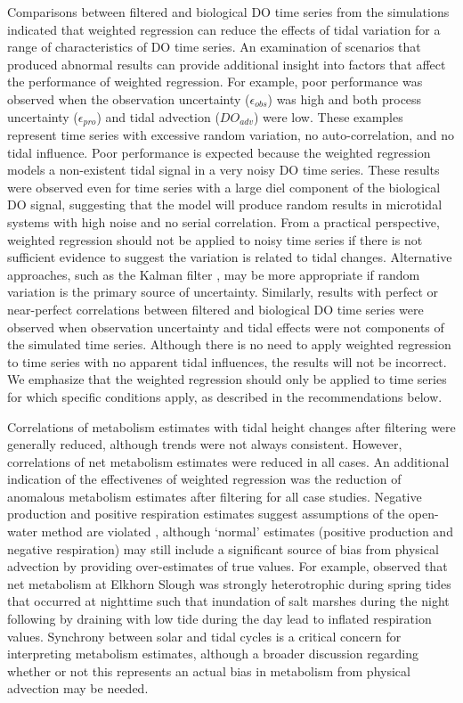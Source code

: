 \documentclass[letterpaper,12pt,oneside]{article}\usepackage[]{graphicx}\usepackage[]{color}
\begin{document}
Comparisons between filtered and biological \ac{DO} time series from the simulations indicated that weighted regression can reduce the effects of tidal variation for a range of characteristics of \ac{DO} time series.  An examination of scenarios that produced abnormal results can provide additional insight into factors that affect the performance of weighted regression.  For example, poor performance was observed when the observation uncertainty ($\epsilon_{obs}$) was high and both process uncertainty ($\epsilon_{pro}$) and tidal advection ($DO_{adv}$) were low.  These examples represent time series with excessive random variation, no auto-correlation, and no tidal influence.  Poor performance is expected because the weighted regression models a non-existent tidal signal in a very noisy \ac{DO} time series.  These results were observed even for time series with a large diel component of the biological \ac{DO} signal, suggesting that the model will produce random results in microtidal systems with high noise and no serial correlation.  From a practical perspective, weighted regression should not be applied to noisy time series if there is not sufficient evidence to suggest the variation is related to tidal changes.  Alternative approaches, such as the Kalman filter \citep{Harvey89,Batt12}, may be more appropriate if random variation is the primary source of uncertainty.  Similarly, results with perfect or near-perfect correlations between filtered and biological \ac{DO} time series were observed when observation uncertainty and tidal effects were not components of the simulated time series.  Although there is no need to apply weighted regression to time series with no apparent tidal influences, the results will not be incorrect.  We emphasize that the weighted regression should only be applied to time series for which specific conditions apply, as described in the recommendations below.  

Correlations of metabolism estimates with tidal height changes after filtering were generally reduced, although trends were not always consistent.  However, correlations of net metabolism estimates were reduced in all cases.  An additional indication of the effectivenes of weighted regression was the reduction of anomalous metabolism estimates after filtering for all case studies.  Negative production and positive respiration estimates suggest assumptions of the open-water method are violated \citep{Needoba12}, although `normal' estimates (positive production and negative respiration) may still include a significant source of bias from physical advection by providing over-estimates of true values.  For example, \citet{Nidzieko14} observed that net metabolism at Elkhorn Slough was strongly heterotrophic during spring tides that occurred at nighttime such that inundation of salt marshes during the night following by draining with low tide during the day lead to inflated respiration values.   Synchrony between solar and tidal cycles is a critical concern for interpreting metabolism estimates, although a broader discussion regarding whether or not this represents an actual bias in metabolism from physical advection may be needed. 
\end{document}
